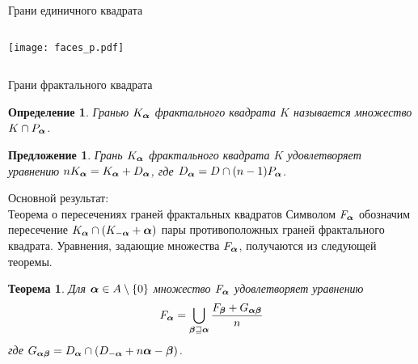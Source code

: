 \documentclass[aspectratio=1610, 10pt, notheorems]{beamer}
\newtheorem{theorem}     {Теорема}
\newtheorem{proposition} {Предложение}
\newtheorem{definition}  {Определение}
\begin{document}
\begin{frame}{Грани единичного квадрата}
\begin{columns}
\texttt{[image: faces\_p.pdf]}
\end{columns}
\end{frame}


\begin{frame}{Грани фрактального квадрата}
\begin{definition}\label{def-falpha}
Гранью $K_{\bm{\alpha}}$ фрактального квадрата $K$ называется множество $K\cap P_{\bm{\alpha}}$.
\end{definition}

\begin{proposition}\label{prop:Ka}
Грань $K_{\bm{\alpha}}$ фрактального квадрата $K$ удовлетворяет уравнению $n K_{\bm{\alpha}}=K_{\bm{\alpha}}+D_{\bm{\alpha}}$, где $D_{\bm{\alpha}}=D\cap(n-1)P_{\bm{\alpha}}$.
\end{proposition}
\end{frame}


\begin{frame}{Основной результат:\\Теорема о пересечениях граней фрактальных квадратов}
Символом $F_{\bm{\alpha}}$ обозначим пересечение $K_{\bm{\alpha}}\cap(K_{-{\bm{\alpha}}}+{\bm{\alpha}})$ пары противоположных граней фрактального квадрата.
Уравнения, задающие множества $F_{\bm{\alpha}}$, получаются из следующей теоремы.

\begin{theorem}\label{thm:falpha}
Для ${\bm{\alpha}}\in A\setminus\{0\}$ множество $F_{\bm{\alpha}}$ удовлетворяет уравнению
\begin{equation}\label{sideint}
F_{\bm{\alpha}}=\bigcup\limits_{{\bm{\beta}}\sqsupseteq{\bm{\alpha}}} \dfrac{F_{\bm{\beta}}+G_{{\bm{\alpha}}{\bm{\beta}}}}{n}
\end{equation}
где $G_{{\bm{\alpha}}{\bm{\beta}}}=D_{\bm{\alpha}}\cap(D_{-{\bm{\alpha}}}+n{\bm{\alpha}}-{\bm{\beta}})$.
\end{theorem}

\end{frame}
\end{document}
